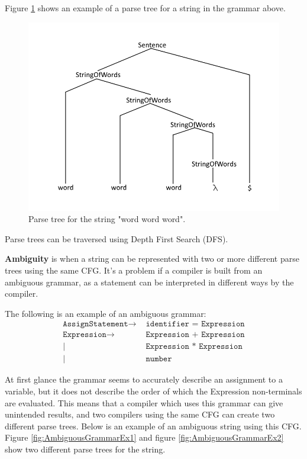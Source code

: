 Figure \ref{fig:ParseTreeEx} shows an example of a parse tree for a string in the grammar above.

\begin{figure}[H]
	\centering
	\includegraphics[width=\textwidth/2+\textwidth/4]{3.Theory/images/ParseTree.png}
	\caption{Parse tree for the string "word word word".}
	\label{fig:ParseTreeEx}
\end{figure}

Parse trees can be traversed using Depth First Search (DFS).

\textbf{Ambiguity} is when a string can be represented with two or more different parse trees using the same CFG.
It's a problem if a compiler is built from an ambiguous grammar, as a statement can be interpreted in different ways by the compiler.

The following is an example of an ambiguous grammar:
\begin{align*}
	\texttt{AssignStatement}\to & \texttt{ identifier = Expression}\\
	\texttt{Expression}\to & \texttt{ Expression + Expression}\\
	| & \texttt{ Expression * Expression}\\
	| & \texttt{ number}
\end{align*}

At first glance the grammar seems to accurately describe an assignment to a variable, but it does not describe the order of which the Expression non-terminals are evaluated.
This means that a compiler which uses this grammar can give unintended results, and two compilers using the same CFG can create two different parse trees.
Below is an example of an ambiguous string using this CFG.
Figure \ref{fig:AmbiguousGrammarEx1} and figure \ref{fig:AmbiguousGrammarEx2} show two different parse trees for the string.

